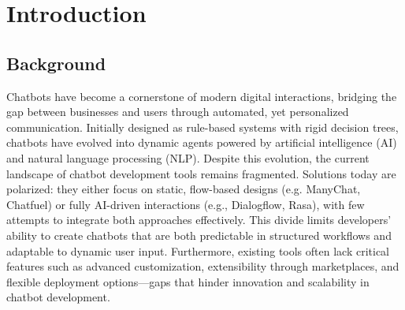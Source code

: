 \chapter{Introduction}

\section{Background}
Chatbots have become a cornerstone of modern digital interactions, bridging the gap between businesses and users through automated, yet personalized communication. Initially designed as rule-based systems with rigid decision trees, chatbots have evolved into dynamic agents powered by artificial intelligence (AI) and natural language processing (NLP). Despite this evolution, the current landscape of chatbot development tools remains fragmented. Solutions today are polarized: they either focus on static, flow-based designs (e.g. ManyChat, Chatfuel) or fully AI-driven interactions (e.g., Dialogflow, Rasa), with few attempts to integrate both approaches effectively. This divide limits developers' ability to create chatbots that are both predictable in structured workflows and adaptable to dynamic user input. Furthermore, existing tools often lack critical features such as advanced customization, extensibility through marketplaces, and flexible deployment options—gaps that hinder innovation and scalability in chatbot development.

